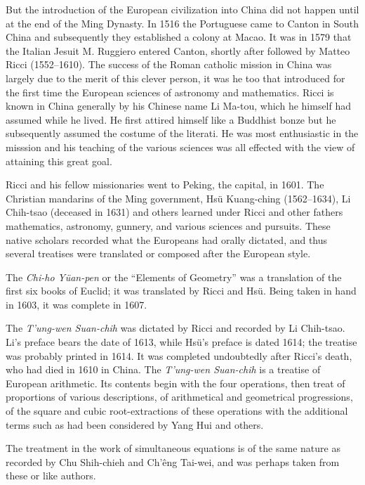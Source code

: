 \documentclass[11pt]{article}
\newcommand{\scanpage}[2]{\clearpage\setcounter{footnote}{0}\noindent{\footnotesize\color{gray}PDF page #1 · #2}\par\medskip}
\newcommand{\scanfooter}{}
\begin{document}
But the introduction of the European civilization into China did not happen until at the end of the Ming Dynasty. In 1516 the Portuguese came to Canton in South China and subsequently they established a colony at Macao. It was in 1579 that the Italian Jesuit M. Ruggiero entered Canton, shortly after followed by Matteo Ricci (1552--1610). The success of the Roman catholic mission in China was largely due to the merit of this clever person, it was he too that introduced for the first time the European sciences of astronomy and mathematics. Ricci is known in China generally by his Chinese name Li Ma-tou, which he himself had assumed while he lived. He first attired himself like a Buddhist bonze but he subsequently assumed the costume of the literati. He was most enthusiastic in the misssion and his teaching of the various sciences was all effected with the view of attaining this great goal.

Ricci and his fellow missionaries went to Peking, the capital, in 1601. The Christian mandarins of the Ming government, Hsü Kuang-ching (1562--1634), Li Chih-tsao (deceased in 1631) and others learned under Ricci and other fathers mathematics, astronomy, gunnery, and various sciences and pursuits. These native scholars recorded what the Europeans had orally dictated, and thus several treatises were translated or composed after the European style.

The \emph{Chi-ho Yüan-pen} or the ``Elements of Geometry'' was a translation of the first six books of Euclid; it was translated by Ricci and Hsü. Being taken in hand in 1603, it was complete in 1607.

The \emph{T'ung-wen Suan-chih} was dictated by Ricci and recorded by Li Chih-tsao. Li's preface bears the date of 1613, while Hsü's preface is dated 1614; the treatise was probably printed in 1614. It was completed undoubtedly after Ricci's death, who had died in 1610 in China. The \emph{T'ung-wen Suan-chih} is a treatise of European arithmetic. Its contents begin with the four operations, then treat of proportions of various descriptions, of arithmetical and geometrical progressions, of the square and cubic root-extractions of these operations with the additional terms such as had been considered by Yang Hui and others.
\scanfooter

\scanpage{0128}{Chapter 17, printed page 114}
\setcounter{footnote}{0}
The treatment in the work of simultaneous equations is of the same nature as recorded by Chu Shih-chieh and Ch'êng Tai-wei, and was perhaps taken from these or like authors.
\end{document}
